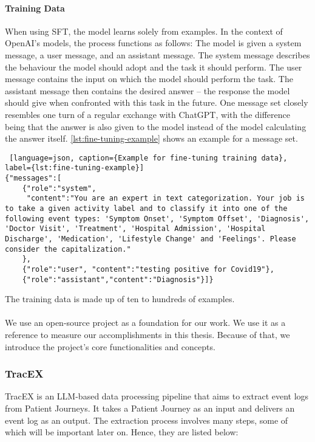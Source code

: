 \paragraph{Training Data}
When using SFT, the model learns solely from examples. In the context of OpenAI's models, the process functions as follows: The model is given a system message, a user message, and an assistant message. The system message describes the behaviour the model should adopt and the task it should perform. The user message contains the input on which the model should perform the task. The assistant message then contains the desired answer – the response the model should give when confronted with this task in the future.
One message set closely resembles one turn of a regular exchange with ChatGPT, with the difference being that the answer is also given to the model instead of the model calculating the answer itself. \autoref{lst:fine-tuning-example} shows an example for a message set.
\begin{lstlisting} [language=json, caption={Example for fine-tuning training data}, label={lst:fine-tuning-example}]   
{"messages":[
    {"role":"system",
     "content":"You are an expert in text categorization. Your job is to take a given activity label and to classify it into one of the following event types: 'Symptom Onset', 'Symptom Offset', 'Diagnosis', 'Doctor Visit', 'Treatment', 'Hospital Admission', 'Hospital Discharge', 'Medication', 'Lifestyle Change' and 'Feelings'. Please consider the capitalization."
    },
    {"role":"user", "content":"testing positive for Covid19"},
    {"role":"assistant","content":"Diagnosis"}]}
\end{lstlisting}
The training data is made up of ten to hundreds of examples.\\\\
We use an open-source project as a foundation for our work. We use it as a reference to measure our accomplishments in this thesis. Because of that, we introduce the project's core functionalities and concepts.

\subsubsection*{TracEX}\label{sec:tracex}
TracEX is an LLM-based data processing pipeline that aims to extract event logs from Patient Journeys. It takes a Patient Journey as an input and delivers an event log as an output. The extraction process involves many steps, some of which will be important later on. Hence, they are listed below:
